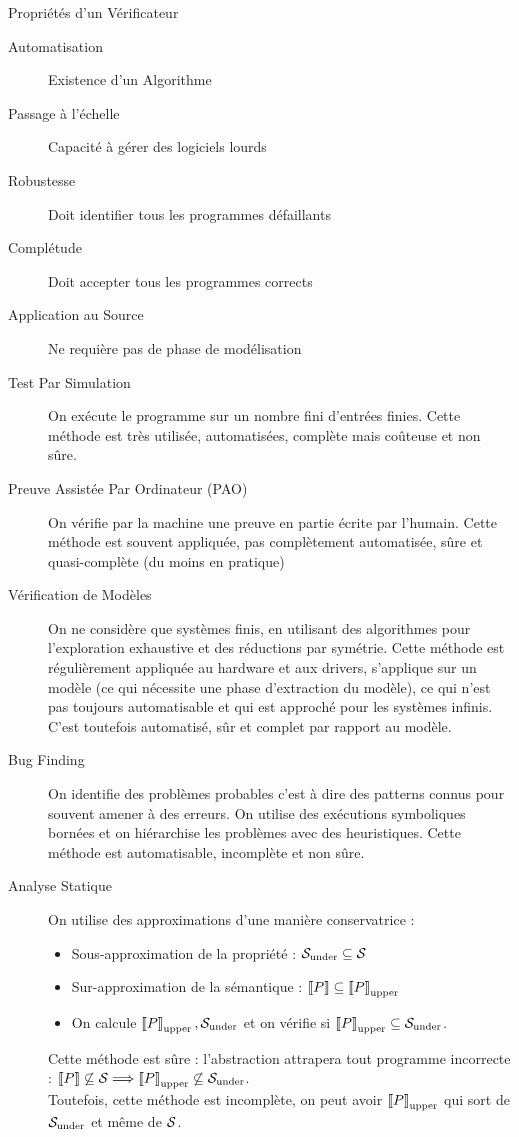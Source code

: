 \documentclass{cours}
\begin{document}
\begin{définition}{Propriétés d'un Vérificateur}{}
    \begin{description}
        \item[Automatisation] Existence d'un Algorithme 
        \item[Passage à l'échelle] Capacité à gérer des logiciels lourds
        \item[Robustesse] Doit identifier tous les programmes défaillants
        \item[Complétude] Doit accepter tous les programmes corrects
        \item[Application au Source] Ne requière pas de phase de modélisation    
    \end{description}
\end{définition}
\begin{description}
    \item[Test Par Simulation] On exécute le programme sur un nombre fini d'entrées finies. Cette méthode est très utilisée, automatisées, complète mais coûteuse et non sûre.
    \item[Preuve Assistée Par Ordinateur (PAO)] On vérifie par la machine une preuve en partie écrite par l'humain. Cette méthode est souvent appliquée, pas complètement automatisée, sûre et quasi-complète (du moins en pratique)
    \item[Vérification de Modèles] On ne considère que systèmes finis, en utilisant des algorithmes pour l'exploration exhaustive et des réductions par symétrie. Cette méthode est régulièrement appliquée au hardware et aux drivers, s'applique sur un modèle (ce qui nécessite une phase d'extraction du modèle), ce qui n'est pas toujours automatisable et qui est approché pour les systèmes infinis. C'est toutefois automatisé, sûr et complet par rapport au modèle.
    \item[Bug Finding] On identifie des problèmes \og probables \fg c'est à dire des patterns connus pour souvent amener à des erreurs. On utilise des exécutions symboliques bornées et on hiérarchise les problèmes avec des heuristiques. Cette méthode est automatisable, incomplète et non sûre.
    \item[Analyse Statique] On utilise des approximations d'une manière conservatrice : 
    \begin{itemize}
        \item Sous-approximation de la propriété : $\mathcal{S}_{\rm under} \subseteq \mathcal{S}$
        \item Sur-approximation de la sémantique : $\left\llbracket P \right\rrbracket \subseteq \left\llbracket P \right\rrbracket_{\rm upper}$
        \item On calcule $\left\llbracket P \right\rrbracket_{\rm upper}, \mathcal{S}_{\rm under}$ et on vérifie si $\left\llbracket P \right\rrbracket_{\rm upper} \subseteq \mathcal{S}_{\rm under}$.
    \end{itemize} 
    Cette méthode est sûre : l'abstraction attrapera tout programme incorrecte : $\left\llbracket P \right\rrbracket \not\subseteq \mathcal{S} \Longrightarrow \left\llbracket P \right\rrbracket_{\rm upper} \not\subseteq \mathcal{S}_{\rm{under}}$.\\
    Toutefois, cette méthode est incomplète, on peut avoir $\left\llbracket P \right\rrbracket_{\rm upper}$ qui sort de $\mathcal{S}_{\rm under}$ et même de $\mathcal{S}$.
\end{description}
\end{document}
